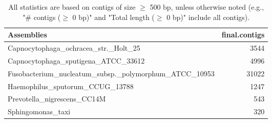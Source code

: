 \documentclass[12pt,a4paper]{article}
\begin{document}
\begin{table}[ht]
\begin{center}
\caption{All statistics are based on contigs of size $\geq$ 500 bp, unless otherwise noted (e.g., "\# contigs ($\geq$ 0 bp)" and "Total length ($\geq$ 0 bp)" include all contigs).}
\begin{tabular}{|l*{1}{|r}|}
\hline
Assemblies & final.contigs \\ \hline
Capnocytophaga\_ochracea\_str.\_Holt\_25 & 3544 \\ \hline
Capnocytophaga\_sputigena\_ATCC\_33612 & 4996 \\ \hline
Fusobacterium\_nucleatum\_subsp.\_polymorphum\_ATCC\_10953 & 31022 \\ \hline
Haemophilus\_sputorum\_CCUG\_13788 & 1247 \\ \hline
Prevotella\_nigrescens\_CC14M & 543 \\ \hline
Sphingomonas\_taxi & 320 \\ \hline
\end{tabular}
\end{center}
\end{table}
\end{document}
